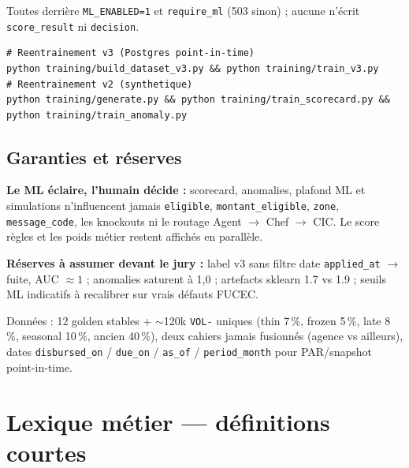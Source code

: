 \documentclass[11pt,a4paper]{article}
\begin{document}
Toutes derrière \texttt{ML\_ENABLED=1} et \texttt{require\_ml} (503 sinon) ; aucune n'écrit \texttt{score\_result} ni \texttt{decision}.

\begin{lstlisting}
# Reentrainement v3 (Postgres point-in-time)
python training/build_dataset_v3.py && python training/train_v3.py
# Reentrainement v2 (synthetique)
python training/generate.py && python training/train_scorecard.py && python training/train_anomaly.py
\end{lstlisting}

\subsection{Garanties et réserves}

\begin{encadrebleu}
\textbf{Le ML éclaire, l'humain décide :} scorecard, anomalies, plafond ML et simulations n'influencent jamais \texttt{eligible}, \texttt{montant\_eligible}, \texttt{zone}, \texttt{message\_code}, les knockouts ni le routage Agent $\rightarrow$ Chef $\rightarrow$ CIC. Le score règles et les poids métier restent affichés en parallèle.
\end{encadrebleu}

\begin{encadreorange}
\textbf{Réserves à assumer devant le jury :} label v3 sans filtre date \texttt{applied\_at} $\rightarrow$ fuite, AUC $\approx 1$ ; anomalies saturent à 1,0 ; artefacts sklearn 1.7 vs 1.9 ; seuils ML indicatifs à recalibrer sur vrais défauts FUCEC.
\end{encadreorange}

Données : 12 golden stables + $\sim$120k \texttt{VOL-} uniques (thin 7\,\%, frozen 5\,\%, late 8\,\%, seasonal 10\,\%, ancien 40\,\%), deux cahiers jamais fusionnés (agence vs ailleurs), dates \texttt{disbursed\_on} / \texttt{due\_on} / \texttt{as\_of} / \texttt{period\_month} pour PAR/snapshot point-in-time.

\section{Lexique métier --- définitions courtes}
\end{document}
